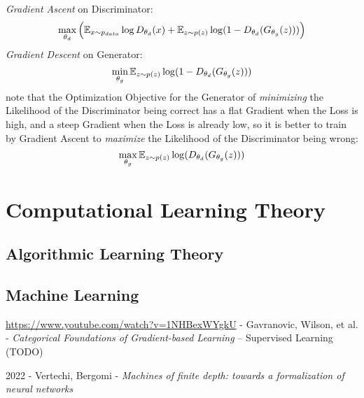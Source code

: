 \emph{Gradient Ascent} on Discriminator:
\[
  \max_{\theta_d} \Big(
    \mathbb{E}_{x \sim p_{data}} \log D_{\theta_d}(x) +
    \mathbb{E}_{z \sim p(z)} \log (1 - D_{\theta_d}(G_{\theta_g}(z)))
  \Big)
\]
\emph{Gradient Descent} on Generator:
\[
  \min_{\theta_g} \mathbb{E}_{z \sim p(z)} \log (1 - D_{\theta_d}(G_{\theta_g}(z)))
\]
note that the Optimization Objective for the Generator of \emph{minimizing} the
Likelihood of the Discriminator being correct has a flat Gradient when the Loss
is high, and a steep Gradient when the Loss is already low, so it is better to
train by Gradient Ascent to \emph{maximize} the Likelihood of the Discriminator
being wrong:
\[
  \max_{\theta_g} \mathbb{E}_{z \sim p(z)} \log (D_{\theta_d}(G_{\theta_g}(z)))
\]



\section{Computational Learning Theory}\label{sec:computational_learning_theory}




\subsection{Algorithmic Learning Theory}\label{sec:algorithmic_learning}

\subsection{Machine Learning}\label{sec:machine_learning}


\url{https://www.youtube.com/watch?v=1NHBexWYgkU} - Gavranovic, Wilson, et al. -
\emph{Categorical Foundations of Gradient-based Learning}
-- Supervised Learning (TODO)

2022 - Vertechi, Bergomi -
\emph{Machines of finite depth: towards a formalization of neural networks}



